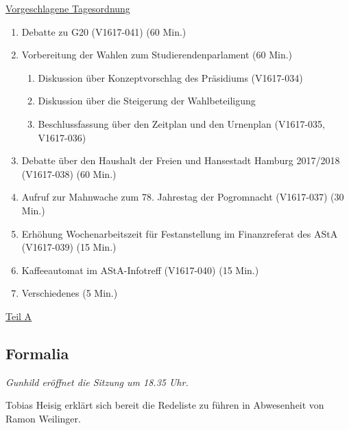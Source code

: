 \documentclass[ngerman,headheight=70pt]{scrartcl}
\begin{document}
    \newpage
    \underline{Vorgeschlagene Tagesordnung}
    \begin{enumerate}[label={\textbf{Top \theenumi}},leftmargin=*]
        \item Debatte zu G20 (V1617-041) (60 Min.)
        \item Vorbereitung der Wahlen zum Studierendenparlament (60 Min.)
        \begin{enumerate}
            \item Diskussion über Konzeptvorschlag des Präsidiums (V1617-034)
            \item Diskussion über die Steigerung der Wahlbeteiligung
            \item Beschlussfassung über den Zeitplan und den Urnenplan
            (V1617-035, V1617-036)
        \end{enumerate}
        \item Debatte über den Haushalt der Freien und Hansestadt Hamburg
              2017/2018 (V1617-038) (60 Min.)
        \item Aufruf zur Mahnwache zum 78. Jahrestag der Pogromnacht (V1617-037) (30 Min.)
        \item Erhöhung Wochenarbeitszeit für Festanstellung im Finanzreferat des AStA (V1617-039) (15 Min.)
        \item Kaffeeautomat im AStA-Infotreff (V1617-040) (15 Min.)
        \item Verschiedenes (5 Min.)
    \end{enumerate}

    \newpage


    {\Large \underline{Teil A}}

    \subsection{Formalia}

    \textit{Gunhild eröffnet die Sitzung um 18.35 Uhr.}

    Tobias Heisig erklärt sich bereit die Redeliste zu führen in Abwesenheit
    von Ramon Weilinger.
\end{document}
